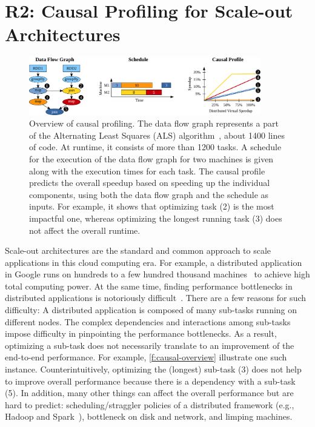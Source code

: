 \section{R2: Causal Profiling for Scale-out Architectures}
\label{sec:causalprofile}

\begin{figure}[!t]
  \centering
  \includegraphics[width=0.90\textwidth]{fig/causal-prof2}
  \caption{
    Overview of causal profiling.
    The data flow graph represents a part of the Alternating Least
    Squares (ALS) algorithm~\cite{meng:sparkml}, about 1400 lines of
    code. At runtime, it consists of more than 1200 tasks.
    A schedule for the execution of the data flow graph for
    two machines is given along with the execution times for each
    task. The causal profile predicts the overall speedup based on
    speeding up the individual components, using both the data flow
    graph and the schedule as inputs. For example, it shows that
    optimizing task (2) is the most impactful one, whereas optimizing the
    longest running task (3) does not affect the overall runtime.
}
\label{f:causal-overview}
\vspace{-5px}
\end{figure}

Scale-out architectures are the standard and common approach to scale
applications in this cloud computing era.
For example, a distributed application in Google runs
on hundreds to a few hundred thousand machines~\cite{google:web} to
achieve high total computing power. At the same time,
finding performance bottlenecks in distributed applications is
notoriously difficult~\cite{pivot-tracing:sosp15, x-ray:osdi12,
  aguilera:dist-system-blackboxes, dist-debugging:queue16,
  whodunit:eurosys07, pinpoint:dsn02, fay:sosp11, x-trace:nsdi07,
  mtracer:sose14, lprof:osdi14, dapper:google10, flowdiff:nsdi11}.
There are a few reasons for such difficulty:
A distributed application is composed of many sub-tasks running on
different nodes.
The complex dependencies and interactions among sub-tasks impose difficulty
in pinpointing the performance bottlenecks.
As a result, optimizing a sub-task does not necessarily translate to an
improvement of the end-to-end performance.
For example, \autoref{f:causal-overview}
illustrate one such instance.
Counterintuitively, optimizing the (longest) sub-task
(3)
does not help to improve overall performance
because there is a dependency with a sub-task (5).
In addition, many other things can affect the overall
performance but are hard to predict: scheduling/straggler policies of
a distributed framework (e.g., Hadoop and Spark~\cite{zaharia:rdd}),
bottleneck on disk and network, and limping machines.

